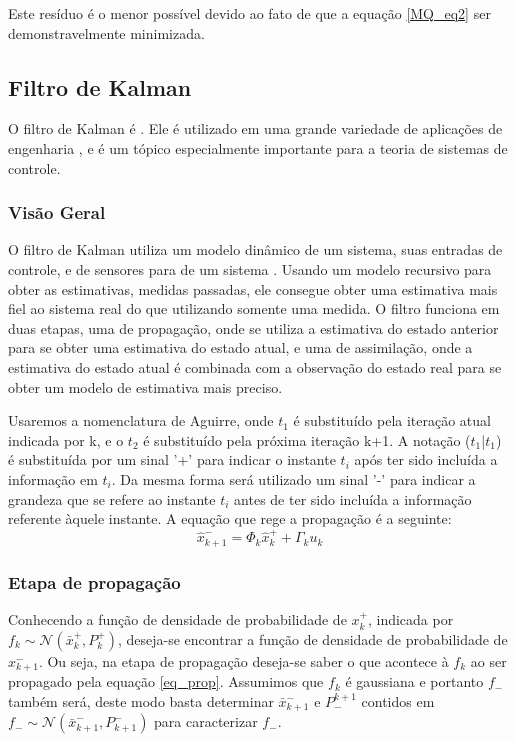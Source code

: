 Este resíduo é o menor possível devido ao fato de que a equação \ref{MQ_eq2} ser demonstravelmente minimizada.

\subsection {Filtro de Kalman}
O filtro de Kalman é . Ele é utilizado em uma grande variedade de aplicações de engenharia , e é um tópico especialmente importante para a teoria de sistemas de controle. 
\subsubsection{Visão Geral}
O filtro de Kalman utiliza um modelo dinâmico de um sistema, suas entradas de controle, e  de sensores para  de um sistema . Usando um modelo recursivo para obter as estimativas, medidas passadas, ele consegue obter uma estimativa mais fiel ao sistema real do que utilizando somente uma medida. O filtro funciona em duas etapas, uma de propagação, onde se utiliza a estimativa do estado anterior para se obter uma estimativa do estado atual, e uma de assimilação, onde a estimativa do estado atual é combinada com a observação do estado real para se obter um modelo de estimativa mais preciso. 


Usaremos a nomenclatura de Aguirre, onde $t_1$ é substituído pela iteração atual indicada por k, e o $t_2$ é substituído pela próxima iteração k+1. A notação ($t_1$|$t_1$) é substituída por um sinal '+' para indicar o instante $t_i$ após ter sido incluída a informação em $t_i$. Da mesma forma será utilizado um sinal '-' para indicar a grandeza que se refere ao instante $t_i$ antes de ter sido incluída a informação referente àquele instante. A equação que rege a propagação é a seguinte:
\begin{equation} \label{eq_prop}
\hat{x}^{-}_{k+1}=\Phi_k \hat{x}^+_k+\Gamma_ku_k
\end{equation}

\subsubsection{Etapa de propagação}
Conhecendo a função de densidade de probabilidade de $x_k^+$, indicada por $f_k\sim \mathcal{N}(\bar{x}^+_k, P^+_k)$, deseja-se encontrar a função de densidade de probabilidade de $x^-_{k+1}$. Ou seja, na etapa de propagação deseja-se saber o que acontece à $f_k$ ao ser propagado pela equação \ref{eq_prop}. Assumimos que $f_k$ é gaussiana e portanto $f_-$ também será, deste modo basta determinar $\bar{x}^-_{k+1}$ e $P_-^{k+1}$ contidos em $f_- \sim \mathcal{N}(\bar{x}^-_{k+1},P^-_{k+1})$ para caracterizar $f_-$.



